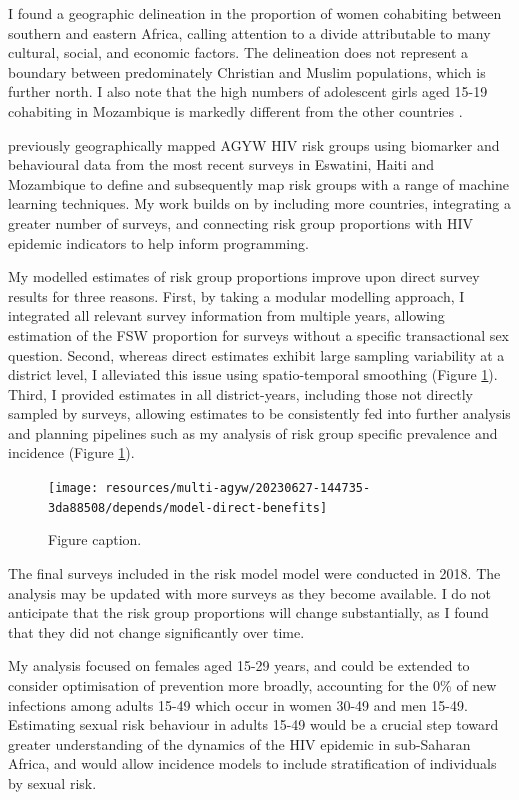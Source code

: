 \documentclass[a4paper, nobind]{templates/ociamthesis}
\begin{document}
I found a geographic delineation in the proportion of women cohabiting between southern and eastern Africa, calling attention to a divide attributable to many cultural, social, and economic factors.
The delineation does not represent a boundary between predominately Christian and Muslim populations, which is further north.
I also note that the high numbers of adolescent girls aged 15-19 cohabiting in Mozambique is markedly different from the other countries \autocite{unicef}.

\textcite{brugh2021characterizing} previously geographically mapped AGYW HIV risk groups using biomarker and behavioural data from the most recent surveys in Eswatini, Haiti and Mozambique to define and subsequently map risk groups with a range of machine learning techniques.
My work builds on \textcite{brugh2021characterizing} by including more countries, integrating a greater number of surveys, and connecting risk group proportions with HIV epidemic indicators to help inform programming.

My modelled estimates of risk group proportions improve upon direct survey results for three reasons.
First, by taking a modular modelling approach, I integrated all relevant survey information from multiple years, allowing estimation of the FSW proportion for surveys without a specific transactional sex question.
Second, whereas direct estimates exhibit large sampling variability at a district level, I alleviated this issue using spatio-temporal smoothing (Figure \ref{fig:model-direct-benefits}).
Third, I provided estimates in all district-years, including those not directly sampled by surveys, allowing estimates to be consistently fed into further analysis and planning pipelines such as my analysis of risk group specific prevalence and incidence (Figure \ref{fig:model-direct-benefits}).



\begin{figure}
\texttt{[image: resources/multi-agyw/20230627-144735-3da88508/depends/model-direct-benefits]} \caption{Figure caption.}\label{fig:model-direct-benefits}
\end{figure}

The final surveys included in the risk model model were conducted in 2018.
The analysis may be updated with more surveys as they become available.
I do not anticipate that the risk group proportions will change substantially, as I found that they did not change significantly over time.

My analysis focused on females aged 15-29 years, and could be extended to consider optimisation of prevention more broadly, accounting for the 0\% of new infections among adults 15-49 which occur in women 30-49 and men 15-49.
Estimating sexual risk behaviour in adults 15-49 would be a crucial step toward greater understanding of the dynamics of the HIV epidemic in sub-Saharan Africa, and would allow incidence models to include stratification of individuals by sexual risk.
\end{document}
